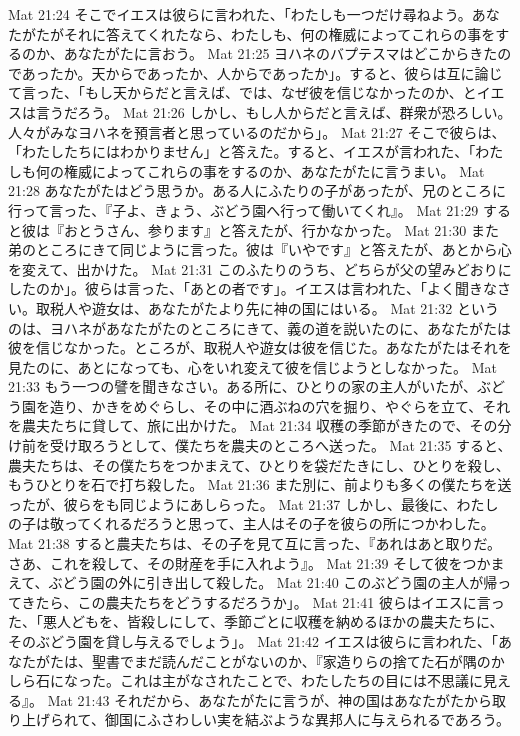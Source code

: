 Mat 21:24  そこでイエスは彼らに言われた、「わたしも一つだけ尋ねよう。あなたがたがそれに答えてくれたなら、わたしも、何の権威によってこれらの事をするのか、あなたがたに言おう。
Mat 21:25  ヨハネのバプテスマはどこからきたのであったか。天からであったか、人からであったか」。すると、彼らは互に論じて言った、「もし天からだと言えば、では、なぜ彼を信じなかったのか、とイエスは言うだろう。
Mat 21:26  しかし、もし人からだと言えば、群衆が恐ろしい。人々がみなヨハネを預言者と思っているのだから」。
Mat 21:27  そこで彼らは、「わたしたちにはわかりません」と答えた。すると、イエスが言われた、「わたしも何の権威によってこれらの事をするのか、あなたがたに言うまい。
Mat 21:28  あなたがたはどう思うか。ある人にふたりの子があったが、兄のところに行って言った、『子よ、きょう、ぶどう園へ行って働いてくれ』。
Mat 21:29  すると彼は『おとうさん、参ります』と答えたが、行かなかった。
Mat 21:30  また弟のところにきて同じように言った。彼は『いやです』と答えたが、あとから心を変えて、出かけた。
Mat 21:31  このふたりのうち、どちらが父の望みどおりにしたのか」。彼らは言った、「あとの者です」。イエスは言われた、「よく聞きなさい。取税人や遊女は、あなたがたより先に神の国にはいる。
Mat 21:32  というのは、ヨハネがあなたがたのところにきて、義の道を説いたのに、あなたがたは彼を信じなかった。ところが、取税人や遊女は彼を信じた。あなたがたはそれを見たのに、あとになっても、心をいれ変えて彼を信じようとしなかった。
Mat 21:33  もう一つの譬を聞きなさい。ある所に、ひとりの家の主人がいたが、ぶどう園を造り、かきをめぐらし、その中に酒ぶねの穴を掘り、やぐらを立て、それを農夫たちに貸して、旅に出かけた。
Mat 21:34  収穫の季節がきたので、その分け前を受け取ろうとして、僕たちを農夫のところへ送った。
Mat 21:35  すると、農夫たちは、その僕たちをつかまえて、ひとりを袋だたきにし、ひとりを殺し、もうひとりを石で打ち殺した。
Mat 21:36  また別に、前よりも多くの僕たちを送ったが、彼らをも同じようにあしらった。
Mat 21:37  しかし、最後に、わたしの子は敬ってくれるだろうと思って、主人はその子を彼らの所につかわした。
Mat 21:38  すると農夫たちは、その子を見て互に言った、『あれはあと取りだ。さあ、これを殺して、その財産を手に入れよう』。
Mat 21:39  そして彼をつかまえて、ぶどう園の外に引き出して殺した。
Mat 21:40  このぶどう園の主人が帰ってきたら、この農夫たちをどうするだろうか」。
Mat 21:41  彼らはイエスに言った、「悪人どもを、皆殺しにして、季節ごとに収穫を納めるほかの農夫たちに、そのぶどう園を貸し与えるでしょう」。
Mat 21:42  イエスは彼らに言われた、「あなたがたは、聖書でまだ読んだことがないのか、『家造りらの捨てた石が隅のかしら石になった。これは主がなされたことで、わたしたちの目には不思議に見える』。
Mat 21:43  それだから、あなたがたに言うが、神の国はあなたがたから取り上げられて、御国にふさわしい実を結ぶような異邦人に与えられるであろう。
